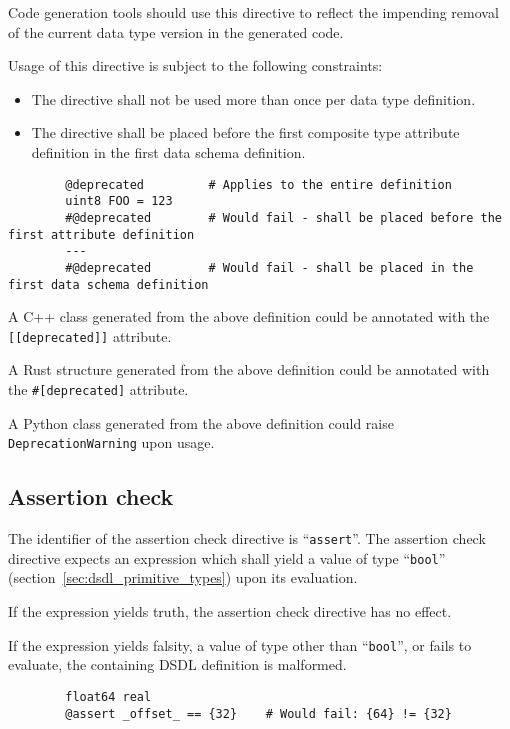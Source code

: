 Code generation tools should use this directive to reflect the impending removal of the current data type version
in the generated code.

Usage of this directive is subject to the following constraints:
\begin{itemize}
    \item The directive shall not be used more than once per data type definition.
    \item The directive shall be placed before the first composite type attribute definition in
          the first data schema definition.
\end{itemize}

\begin{remark}
    \begin{verbatim}
        @deprecated         # Applies to the entire definition
        uint8 FOO = 123
        #@deprecated        # Would fail - shall be placed before the first attribute definition
        ---
        #@deprecated        # Would fail - shall be placed in the first data schema definition
    \end{verbatim}

    A C++ class generated from the above definition could be annotated with the \verb|[[deprecated]]| attribute.

    A Rust structure generated from the above definition could be annotated with the \verb|#[deprecated]| attribute.

    A Python class generated from the above definition could raise \verb|DeprecationWarning| upon usage.
\end{remark}

\subsection{Assertion check}

The identifier of the assertion check directive is ``\verb|assert|''.
The assertion check directive expects an expression which shall yield a value of type
``\verb|bool|'' (section~\ref{sec:dsdl_primitive_types}) upon its evaluation.

If the expression yields truth, the assertion check directive has no effect.

If the expression yields falsity, a value of type other than ``\verb|bool|'', or fails to evaluate,
the containing DSDL definition is malformed.

\begin{remark}
    \begin{verbatim}
        float64 real
        @assert _offset_ == {32}    # Would fail: {64} != {32}
    \end{verbatim}
\end{remark}

